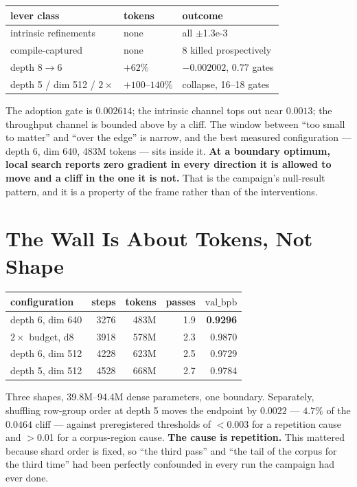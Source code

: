 \documentclass{article}
\newcommand{\vb}{\mathrm{val\_bpb}}
\begin{document}
\begin{center}\begin{small}
\begin{tabular}{lll}
\toprule
lever class & tokens & outcome \\
\midrule
intrinsic refinements & none & all $\pm$1.3e-3 \\
compile-captured & none & 8 killed prospectively \\
depth $8{\to}6$ & $+62$\% & $-0.002002$, 0.77 gates \\
depth 5 / dim 512 / $2\times$ & $+100$--$140$\% & collapse, 16--18 gates \\
\bottomrule
\end{tabular}
\end{small}\end{center}

The adoption gate is $0.002614$; the intrinsic channel tops out near $0.0013$; the throughput channel is bounded above by a cliff. The window between ``too small to matter'' and ``over the edge'' is narrow, and the best measured configuration --- depth 6, dim 640, 483M tokens --- sits inside it. \textbf{At a boundary optimum, local search reports zero gradient in every direction it is allowed to move and a cliff in the one it is not.} That is the campaign's null-result pattern, and it is a property of the frame rather than of the interventions.

\section{The Wall Is About Tokens, Not Shape}
\begin{center}\begin{small}
\begin{tabular}{lrrrr}
\toprule
configuration & steps & tokens & passes & $\vb$ \\
\midrule
depth 6, dim 640 & 3276 & 483M & 1.9 & \textbf{0.9296} \\
$2\times$ budget, d8 & 3918 & 578M & 2.3 & 0.9870 \\
depth 6, dim 512 & 4228 & 623M & 2.5 & 0.9729 \\
depth 5, dim 512 & 4528 & 668M & 2.7 & 0.9784 \\
\bottomrule
\end{tabular}
\end{small}\end{center}

Three shapes, 39.8M--94.4M dense parameters, one boundary. Separately, shuffling row-group order at depth 5 moves the endpoint by $0.0022$ --- $4.7$\% of the $0.0464$ cliff --- against preregistered thresholds of $<$0.003 for a repetition cause and $>$0.01 for a corpus-region cause. \textbf{The cause is repetition.} This mattered because shard order is fixed, so ``the third pass'' and ``the tail of the corpus for the third time'' had been perfectly confounded in every run the campaign had ever done.
\end{document}
